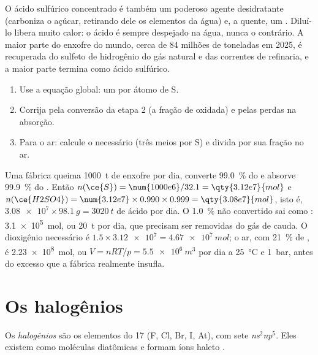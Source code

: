 O ácido sulfúrico concentrado é também um poderoso agente desidratante
(carboniza o açúcar, retirando dele os elementos da água) e, a quente, um
. Diluí-lo libera muito calor: o ácido é sempre despejado na
água, nunca o contrário. A maior parte do enxofre do mundo, cerca de 84
milhões de toneladas em 2025, é recuperada do sulfeto de hidrogênio do
gás natural e das correntes de refinaria, e a maior parte termina como
ácido sulfúrico.

\begin{method}\label{met:b1:p-block-16-18:contact-balance}
\begin{enumerate}
  \item Use a equação global: um  por átomo de S.
  \item Corrija pela conversão da etapa 2 (a fração de 
        oxidada) e pelas perdas na absorção.
  \item Para o ar: calcule o  necessário (três meios por S) e
        divida por sua fração no ar.
\end{enumerate}
\end{method}

\begin{example}
Uma fábrica queima \qty{1000}{t} de enxofre por dia, converte \qty{99.0}{\percent}
do  e absorve \qty{99.9}{\percent} do . Então
$n(\ce{S}) = \num{1000e6}/32.1 = \qty{3.12e7}{mol}$ e
$n(\ce{H2SO4}) = \num{3.12e7} \times 0.990 \times 0.999
= \qty{3.08e7}{mol}$, isto é, $\num{3.08e7} \times \qty{98.1}{g}
= \qty{3020}{t}$ de ácido por dia. O \qty{1.0}{\percent} não convertido sai
como : \qty{3.1e5}{mol}, ou \qty{20}{t} por dia, que precisam ser
removidas do gás de cauda. O dioxigênio necessário é $1.5 \times \num{3.12e7} =
\qty{4.67e7}{mol}$; o ar, com \qty{21}{\percent} de , é
\qty{2.23e8}{mol}, ou $V = nRT/p = \qty{5.5e6}{m^3}$ por dia a
\qty{25}{\celsius} e \qty{1}{bar}, antes do excesso que a fábrica
realmente insufla.
\end{example}

\section{Os halogênios}

\begin{definition}[Halogênios]\label{def:b1:p-block-16-18:halogen}
Os \emph{halogênios} são os elementos do  17 (F, Cl,
Br, I, At), com sete  \textit{ns}$^2$\textit{np}$^5$.
Eles existem como moléculas diatômicas  e formam íons haleto .
\end{definition}

